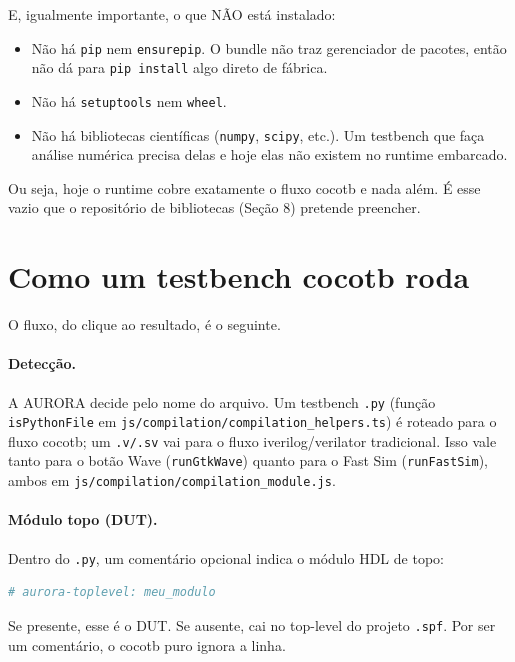 \documentclass[11pt,a4paper]{article}
\begin{document}
E, igualmente importante, o que NÃO está instalado:

\begin{itemize}
  \item Não há \texttt{pip} nem \texttt{ensurepip}. O bundle não traz gerenciador
        de pacotes, então não dá para \texttt{pip install} algo direto de fábrica.
  \item Não há \texttt{setuptools} nem \texttt{wheel}.
  \item Não há bibliotecas científicas (\texttt{numpy}, \texttt{scipy}, etc.). Um
        testbench que faça análise numérica precisa delas e hoje elas não existem
        no runtime embarcado.
\end{itemize}

Ou seja, hoje o runtime cobre exatamente o fluxo cocotb e nada além. É esse vazio
que o repositório de bibliotecas (Seção 8) pretende preencher.

\section{Como um testbench cocotb roda}

O fluxo, do clique ao resultado, é o seguinte.

\paragraph{Detecção.} A AURORA decide pelo nome do arquivo. Um testbench
\texttt{.py} (função \texttt{isPythonFile} em
\texttt{js/compilation/compilation\_helpers.ts}) é roteado para o fluxo cocotb;
um \texttt{.v/.sv} vai para o fluxo iverilog/verilator tradicional. Isso vale
tanto para o botão Wave (\texttt{runGtkWave}) quanto para o Fast Sim
(\texttt{runFastSim}), ambos em
\texttt{js/compilation/compilation\_module.js}.

\paragraph{Módulo topo (DUT).} Dentro do \texttt{.py}, um comentário opcional
indica o módulo HDL de topo:

\begin{lstlisting}[language=python]
# aurora-toplevel: meu_modulo
\end{lstlisting}

Se presente, esse é o DUT. Se ausente, cai no top-level do projeto \texttt{.spf}.
Por ser um comentário, o cocotb puro ignora a linha.
\end{document}
